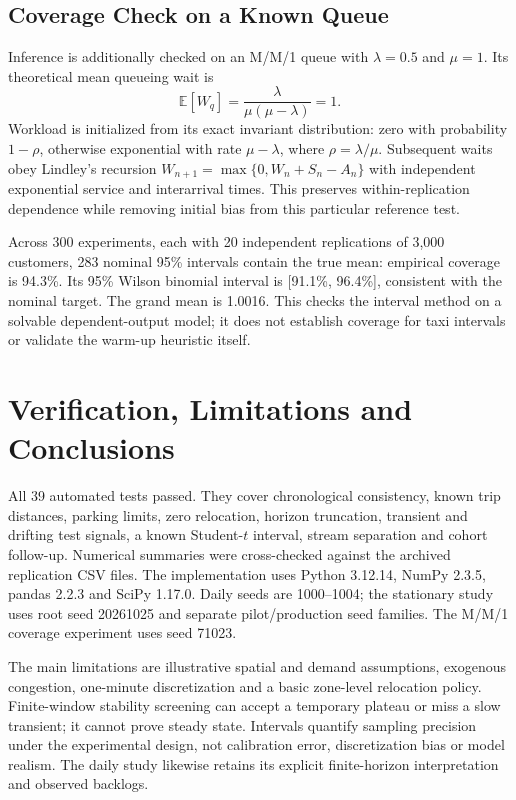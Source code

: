 \documentclass[10pt,twocolumn,letterpaper]{article}
\begin{document}
\subsection{Coverage Check on a Known Queue}
Inference is additionally checked on an M/M/1 queue with $\lambda=0.5$ and
$\mu=1$. Its theoretical mean queueing wait is
\begin{equation}
 \mathbb E[W_q]=\frac{\lambda}{\mu(\mu-\lambda)}=1.\label{eq:mm1}
\end{equation}
Workload is initialized from its exact invariant distribution: zero with
probability $1-\rho$, otherwise exponential with rate $\mu-\lambda$, where
$\rho=\lambda/\mu$. Subsequent waits obey Lindley's recursion
$W_{n+1}=\max\{0,W_n+S_n-A_n\}$ with independent exponential service and
interarrival times. This preserves within-replication dependence while removing
initial bias from this particular reference test.

Across 300 experiments, each with 20 independent replications of 3,000
customers, 283 nominal 95\% intervals contain the true mean: empirical coverage
is 94.3\%. Its 95\% Wilson binomial interval is [91.1\%, 96.4\%], consistent with
the nominal target. The grand mean is 1.0016. This checks the interval method
on a solvable dependent-output model; it does not establish coverage for taxi
intervals or validate the warm-up heuristic itself.

\balance
\section{Verification, Limitations and Conclusions}
All 39 automated tests passed. They cover chronological consistency, known
trip distances, parking limits, zero relocation, horizon truncation, transient
and drifting test signals, a known Student-$t$ interval, stream separation and
cohort follow-up. Numerical summaries were cross-checked against the archived
replication CSV files. The implementation uses Python 3.12.14, NumPy 2.3.5,
pandas 2.2.3 and SciPy 1.17.0. Daily seeds are 1000--1004; the stationary study
uses root seed 20261025 and separate pilot/production seed families. The M/M/1
coverage experiment uses seed 71023.

The main limitations are illustrative spatial and demand assumptions,
exogenous congestion, one-minute discretization and a basic zone-level
relocation policy. Finite-window stability screening can accept a temporary
plateau or miss a slow transient; it cannot prove steady state. Intervals
quantify sampling precision under the experimental design, not calibration
error, discretization bias or model realism. The daily study likewise retains
its explicit finite-horizon interpretation and observed backlogs.
\end{document}
